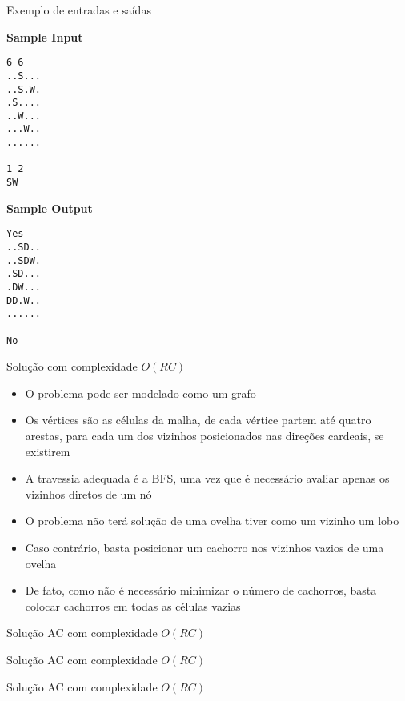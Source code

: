 \begin{frame}[fragile]{Exemplo de entradas e saídas}

\begin{minipage}[t]{0.5\textwidth}
\textbf{Sample Input}
\begin{verbatim}
6 6
..S...
..S.W.
.S....
..W...
...W..
......

1 2
SW
\end{verbatim}
\end{minipage}
\begin{minipage}[t]{0.45\textwidth}
\textbf{Sample Output}
\begin{verbatim}
Yes
..SD..
..SDW.
.SD...
.DW...
DD.W..
......

No
\end{verbatim}
\end{minipage}
\end{frame}

\begin{frame}[fragile]{Solução com complexidade $O(RC)$}

    \begin{itemize}
        \item O problema pode ser modelado como um grafo

        \item Os vértices são as células da malha, de cada vértice partem até quatro arestas,
            para cada um dos vizinhos posicionados nas direções cardeais, se existirem

        \item A travessia adequada é a BFS, uma vez que é necessário avaliar apenas os vizinhos
            diretos de um nó

        \item O problema não terá solução de uma ovelha tiver como um vizinho um lobo

        \item Caso contrário, basta posicionar um cachorro nos vizinhos vazios de uma ovelha

        \item De fato, como não é necessário minimizar o número de cachorros, basta colocar
            cachorros em todas as células vazias
   \end{itemize}

\end{frame}

\begin{frame}[fragile]{Solução AC com complexidade $O(RC)$}
\end{frame}

\begin{frame}[fragile]{Solução AC com complexidade $O(RC)$}
\end{frame}

\begin{frame}[fragile]{Solução AC com complexidade $O(RC)$}
\end{frame}
